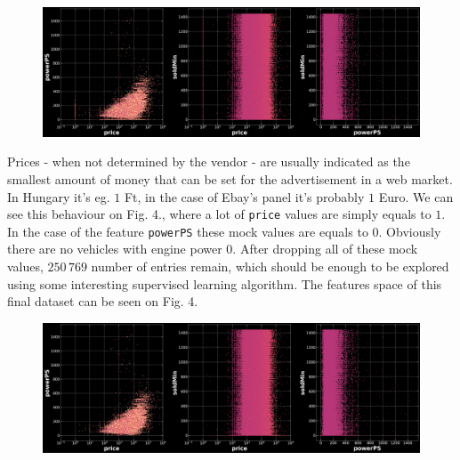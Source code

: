 \begin{figure}[h]
	\begin{center}
		\includegraphics[width=\linewidth]{./images/fig_3_feat_space_pre.png}
	\end{center}
\end{figure}
Prices - when not determined by the vendor - are usually indicated as the smallest amount of money that can be set for the advertisement in a web market. In Hungary it's eg. $1$ Ft, in the case of Ebay's panel it's probably $1$ Euro. We can see this behaviour on Fig. 4., where a lot of \texttt{price} values are simply equals to $1$.
In the case of the feature \texttt{powerPS} these mock values are equals to $0$. Obviously there are no vehicles with engine power $0$. After dropping all of these mock values, $250\,769$ number of entries remain, which should be enough to be explored using some interesting supervised learning algorithm. The features space of this final dataset can be seen on Fig. 4.

\begin{figure}[h]
	\begin{center}
		\includegraphics[width=\linewidth]{./images/fig_4_feat_space_after.png}
	\end{center}
\end{figure}

